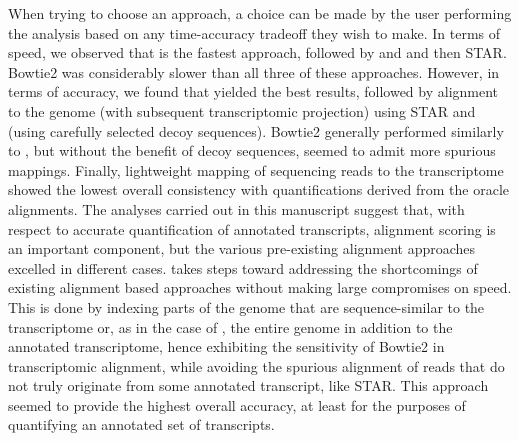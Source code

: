 When trying to choose an approach, a choice can be made by the user
performing the analysis based on any time-accuracy tradeoff they wish to
make. In terms of speed, we observed that \qm is the fastest approach,
followed by \hsa and \saf and then STAR. Bowtie2 was considerably slower than
all three of these approaches. However, in terms of accuracy, we found that
\saf yielded the best results, followed by alignment to the genome
(with subsequent transcriptomic projection) using STAR and \hsa (using
carefully selected decoy sequences). Bowtie2 generally performed similarly to
\hsa, but without the benefit of decoy sequences, seemed to admit more
spurious mappings. Finally, lightweight mapping of sequencing reads to the
transcriptome showed the lowest overall consistency with quantifications
derived from the oracle alignments. The analyses carried out in this
manuscript suggest that, with respect to accurate quantification of annotated
transcripts, alignment scoring is an important component, but the various
pre-existing alignment approaches excelled in different cases. \hsa takes
steps toward addressing the shortcomings of existing alignment based
approaches without making large compromises on speed. This is done by
indexing parts of the genome that are sequence-similar to the transcriptome or,
as in the case of \saf, the entire genome in addition to the annotated transcriptome, hence
exhibiting the sensitivity of Bowtie2 in transcriptomic alignment, while
avoiding the spurious alignment of reads that do not truly originate from
some annotated transcript, like STAR. This approach seemed to provide the
highest overall accuracy, at least for the purposes of quantifying an
annotated set of transcripts.